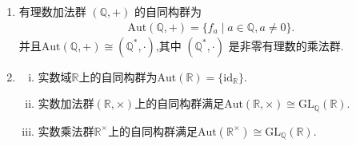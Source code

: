 \documentclass[../../main.tex]{subfiles}%
\begin{document}
\begin{proposition}
\begin{enumerate}[(1)]
\item 有理数加法群 $(\mathbb{Q},+)$ 的自同构群为
\begin{align*}
\mathrm{Aut}(\mathbb{Q},+) = \{f_a \mid a \in \mathbb{Q}, a \neq 0\}.
\end{align*}
并且$\mathrm{Aut}(\mathbb{Q},+) \cong (\mathbb{Q}^*,\cdot)$,其中 $(\mathbb{Q}^*,\cdot)$ 是非零有理数的乘法群.

\item \begin{enumerate}[(i)]
\item 实数域$\mathbb{R}$上的自同构群为$\text{Aut}(\mathbb{R})=\{\text{id}_{\mathbb{R}}\}$.

\item 实数加法群$(\mathbb{R},\times)$上的自同构群满足$\text{Aut}(\mathbb{R},\times)\cong \text{GL}_{\mathbb{Q}}(\mathbb{R})$.

\item 实数乘法群$\mathbb{R}^{\times}$上的自同构群满足$\text{Aut}(\mathbb{R}^{\times})\cong \text{GL}_{\mathbb{Q}}(\mathbb{R})$.
\end{enumerate}
\end{enumerate}
\end{proposition}
\end{document}

